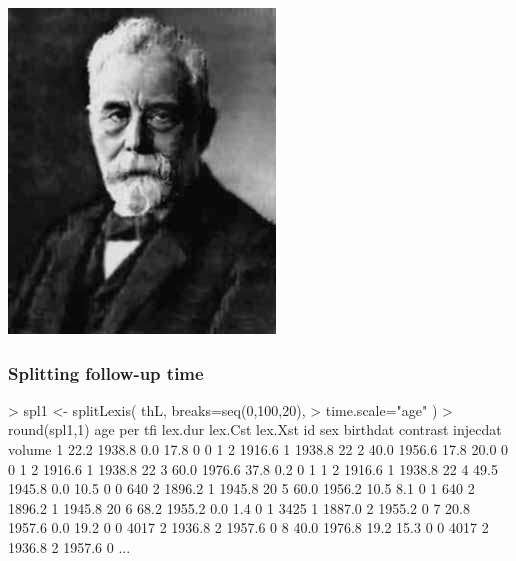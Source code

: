 \begin{frame}[fragile]
\begin{minipage}[t]{0.38\textwidth}
   \includegraphics[width=\textwidth,keepaspectratio]{Lexis-portrait}
  \end{minipage}
\end{frame}

\begin{frame}[fragile]
  \frametitle{Splitting follow-up time}
\footnotesize
\renewcommand{\baselinestretch}{0.9}
\begin{semiverbatim}
> spl1 <- splitLexis( thL, breaks=seq(0,100,20),
>                          time.scale="age" )
> round(spl1,1)
   age    per  tfi lex.dur lex.Cst lex.Xst   id sex birthdat contrast injecdat volume
\alert<2>{1 22.2 1938.8  0.0    17.8       0       0    1   2   1916.6        1   1938.8     22}
\alert<2>{2 40.0 1956.6 17.8    20.0       0       0    1   2   1916.6        1   1938.8     22}
\alert<2>{3 60.0 1976.6 37.8     0.2       0       1    1   2   1916.6        1   1938.8     22}
\alert<3>{4 49.5 1945.8  0.0    10.5       0       0  640   2   1896.2        1   1945.8     20}
\alert<3>{5 60.0 1956.2 10.5     8.1       0       1  640   2   1896.2        1   1945.8     20}
\alert<4>{6 68.2 1955.2  0.0     1.4       0       1 3425   1   1887.0        2   1955.2      0}
\alert<5>{7 20.8 1957.6  0.0    19.2       0       0 4017   2   1936.8        2   1957.6      0}
\alert<5>{8 40.0 1976.8 19.2    15.3       0       0 4017   2   1936.8        2   1957.6      0}
...
\end{semiverbatim}
\renewcommand{\baselinestretch}{1.0}

\end{frame}

